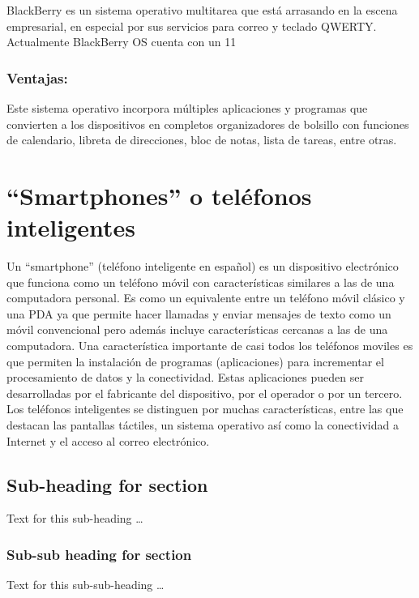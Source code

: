 \documentclass{bmcart}
\begin{document}
BlackBerry es un sistema operativo multitarea que está arrasando en la escena
empresarial, en especial por sus servicios para correo y teclado QWERTY.
Actualmente BlackBerry OS cuenta con un 11%

\subsubsection*{Ventajas:}
 Este sistema operativo incorpora múltiples aplicaciones y programas
 que convierten a los dispositivos en completos organizadores de bolsillo con
 funciones de calendario, libreta de direcciones, bloc de notas, lista de tareas, entre
 otras.



\newpage  

\section*{“Smartphones” o teléfonos inteligentes}

	Un “smartphone” (teléfono inteligente en español) es un dispositivo electrónico que
	funciona como un teléfono móvil con características similares a las de una computadora
	personal. Es como un equivalente entre un teléfono móvil clásico y una PDA
	ya que permite hacer llamadas y enviar mensajes de texto como un móvil
	convencional pero además incluye características cercanas a las de una computadora. 
	Una característica importante de casi todos los teléfonos moviles es que
	permiten la instalación de programas (aplicaciones) para incrementar el procesamiento de datos y la
	conectividad. Estas aplicaciones pueden ser desarrolladas por el fabricante del
	dispositivo, por el operador o por un tercero.
	Los teléfonos inteligentes se distinguen por muchas características, entre las que
	destacan las pantallas táctiles, un sistema operativo así como la conectividad a
	Internet y el acceso al correo electrónico.

  
\subsection*{Sub-heading for section}
Text for this sub-heading \ldots
\subsubsection*{Sub-sub heading for section}
Text for this sub-sub-heading \ldots
\end{document}
